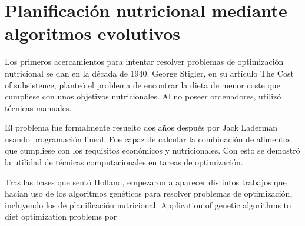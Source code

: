 \section{Planificación nutricional mediante algoritmos evolutivos}

Los primeros acercamientos para intentar resolver problemas de optimización nutricional se dan en la década de 1940. George Stigler, en su artículo The Cost of subsistence, planteó el problema de encontrar la dieta de menor coste que cumpliese con unos objetivos nutricionales. Al no poseer ordenadores, utilizó técnicas manuales.

El problema fue formalmente resuelto dos años después por Jack Laderman usando programación lineal. Fue capaz de calcular la combinación de alimentos que cumpliese con los requisitos económicos y nutricionales. Con esto se demostró la utilidad de técnicas computacionales en tareas de optimización.

Tras las bases que sentó Holland, empezaron a aparecer distintos trabajos que hacían uso de los algoritmos genéticos para resolver problemas de optimización, incluyendo los de planificación nutricional. Application of genetic algorithms to diet optimization problems por 








